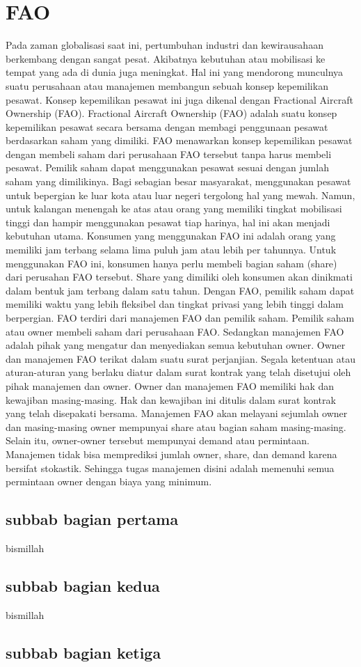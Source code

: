 \chapter{FAO}
Pada zaman globalisasi saat ini, pertumbuhan industri dan kewirausahaan berkembang dengan sangat pesat. Akibatnya kebutuhan atau mobilisasi ke tempat yang ada di dunia juga meningkat. Hal ini yang mendorong munculnya suatu perusahaan atau manajemen membangun sebuah konsep kepemilikan pesawat. Konsep kepemilikan pesawat ini juga dikenal dengan Fractional Aircraft Ownership  (FAO).
Fractional Aircraft Ownership (FAO) adalah suatu konsep kepemilikan pesawat secara bersama dengan membagi penggunaan pesawat berdasarkan saham yang dimiliki. FAO menawarkan konsep kepemilikan pesawat dengan membeli saham dari perusahaan FAO tersebut tanpa harus membeli pesawat. Pemilik saham dapat menggunakan pesawat sesuai dengan jumlah saham yang dimilikinya. 
Bagi sebagian besar masyarakat, menggunakan pesawat untuk bepergian ke luar kota atau luar negeri tergolong hal yang mewah. Namun, untuk kalangan menengah ke atas atau orang yang memiliki tingkat mobilisasi tinggi dan hampir menggunakan pesawat tiap harinya, hal ini akan menjadi kebutuhan utama. Konsumen yang menggunakan FAO ini adalah orang yang memiliki jam terbang selama lima puluh jam atau lebih per tahunnya.
Untuk menggunakan FAO ini, konsumen hanya perlu membeli bagian saham (share) dari perusahan FAO tersebut. Share yang dimiliki oleh konsumen akan dinikmati dalam bentuk jam terbang dalam satu tahun. Dengan FAO, pemilik saham dapat memiliki waktu yang lebih fleksibel dan tingkat privasi yang lebih tinggi dalam berpergian.
FAO terdiri dari manajemen FAO dan pemilik saham. Pemilik saham atau owner membeli saham dari perusahaan FAO. Sedangkan manajemen FAO adalah pihak yang mengatur dan menyediakan semua kebutuhan owner. Owner dan manajemen FAO terikat dalam suatu surat perjanjian. Segala ketentuan atau aturan-aturan yang berlaku diatur dalam surat kontrak yang telah disetujui oleh pihak manajemen dan owner. Owner dan manajemen FAO memiliki hak dan kewajiban masing-masing. Hak dan kewajiban ini ditulis dalam surat kontrak yang telah disepakati bersama. 
Manajemen FAO akan melayani sejumlah owner dan masing-masing owner mempunyai share atau bagian saham masing-masing. Selain itu, owner-owner tersebut mempunyai demand atau permintaan. Manajemen tidak bisa memprediksi jumlah owner, share, dan demand karena bersifat stokastik. Sehingga tugas manajemen disini adalah memenuhi semua permintaan owner dengan biaya yang minimum.
\section{subbab bagian pertama}
bismillah
\section{subbab bagian kedua}
bismillah
\section{subbab bagian ketiga}